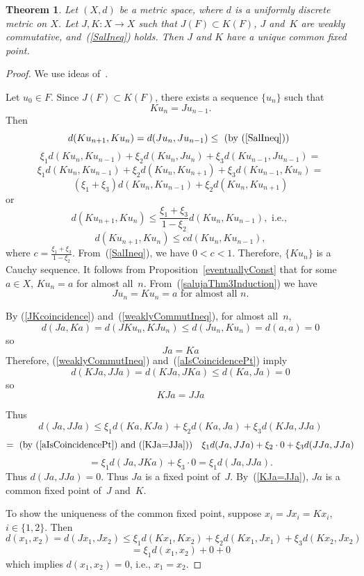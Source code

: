\documentclass{article}
\newtheorem{thm}{Theorem}
\numberwithin{thm}{section}
\begin{document}
\begin{thm}
    \label{improvedSaluja}
     Let $(X,d)$ be a metric space, where $d$ is a
    uniformly discrete metric on $X$. Let $J,K: X \to X$ such that
    $J(F) \subset K(F)$, $J$ and~$K$ are weakly
    commutative, and~(\ref{SalIneq}) holds.
      Then $J$ and $K$ have a unique common fixed point.
\end{thm}

\begin{proof}
    We use ideas of~\cite{Saluja}.

    Let $u_0 \in F$. Since $J(F) \subset K(F)$,
    there exists a sequence $\{u_n\}$ such that
\begin{equation}
\label{salujaThm3Induction}
     Ku_n = Ju_{n-1}.
\end{equation}
Then
\[ d(Ku_{n+1}, Ku_n) = d(Ju_n,Ju_{n-1}) \le 
\mbox{ (by (\ref{SalIneq})) }
\]
\[ \xi_1d(Ku_n,Ku_{n-1}) + \xi_2d(Ku_n, Ju_n) +
    \xi_3d(Ku_{n-1},Ju_{n-1}) =
    \] 
\[ \xi_1d(Ku_n,Ku_{n-1}) + \xi_2d(Ku_n, Ku_{n+1}) +
    \xi_3d(Ku_{n-1},Ku_n) =
    \]
    \[
(\xi_1 + \xi_3) d(Ku_n,Ku_{n-1}) + \xi_2 d(Ku_n,Ku_{n+1})
\]
or
\[ d(Ku_{n+1}, Ku_n) \le
   \frac{\xi_1 + \xi_3}{1 - \xi_2} d(Ku_n,Ku_{n-1}), 
   \mbox{ i.e., }
\]
\[ d(Ku_{n+1}, Ku_n) \le cd(Ku_n,Ku_{n-1}), 
\]
where $c = \frac{\xi_1 + \xi_3}{1 - \xi_2}$. 
From~(\ref{SalIneq}), we have $0 < c < 1$.
Therefore, $\{Ku_n\}$ is a Cauchy sequence. It follows from
Proposition~\ref{eventuallyConst} that for some $a \in X$,
$Ku_n = a$ for almost all~$n$. From~(\ref{salujaThm3Induction})
we have 
\begin{equation}
    \label{JKcoincidence}
    Ju_n = Ku_n = a \mbox{ for almost all } n.
\end{equation}

By (\ref{JKcoincidence}) and~(\ref{weaklyCommutIneq}), 
for almost all~$n$,
\[ d(Ja,Ka) = d(JKu_n,KJu_n) \le
    d(Ju_n, Ku_n) = d(a,a) = 0\]
so
\begin{equation}
\label{aIsCoincidencePt}
    Ja = Ka
\end{equation}
Therefore, (\ref{weaklyCommutIneq}) and~(\ref{aIsCoincidencePt}) imply
\[ d(KJa,JJa) = d(KJa,JKa) \le d(Ka,Ja) = 0
\]
so
\begin{equation}
\label{KJa=JJa}
    KJa = JJa
\end{equation}

Thus
\[ d(Ja,JJa) \le \xi_1 d(Ka,KJa) + \xi_2 d(Ka,Ja) +
   \xi_3 d(KJa,JJa)
\]
\[ = \mbox{ (by (\ref{aIsCoincidencePt}) and (\ref{KJa=JJa})) } ~~\xi_1 d(Ja,JJa) + \xi_2 \cdot 0 + \xi_3 d(JJa,JJa) 
\]
\[ = \xi_1 d(Ja,JKa) + \xi_3 \cdot 0 = \xi_1 d(Ja,JJa).
\]
Thus 
$d(Ja,JJa) = 0$. Thus $Ja$ is a fixed point of~$J$.
By~(\ref{KJa=JJa}), $Ja$ is a common fixed point
of~$J$ and~$K$.

To show the uniqueness of the common fixed point, 
suppose $x_i = Jx_i = Kx_i$, $i \in \{1,2\}$. Then
\[ d(x_1,x_2) = d(Jx_1,Jx_2) \le
   \xi_1 d(Kx_1,Kx_2) + \xi_2 d(Kx_1,Jx_1) +
   \xi_3 d(Kx_2,Jx_2)
\]
\[ = \xi_1 d(x_1,x_2) + 0 + 0
\]
which implies $d(x_1,x_2)=0$, i.e., $x_1 = x_2$.
\end{proof}
\end{document}
